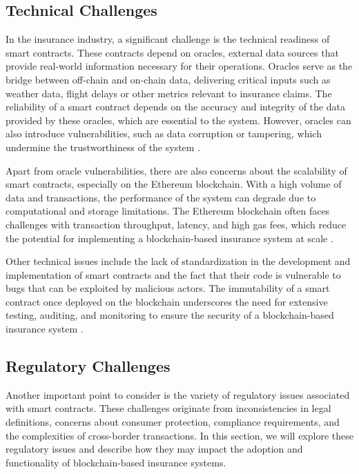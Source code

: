 \subsection{Technical Challenges}
In the insurance industry, a significant challenge is the technical readiness of smart contracts. These contracts depend on oracles, external data sources that provide real-world information necessary for their operations. Oracles serve as the bridge between off-chain and on-chain data, delivering critical inputs such as weather data, flight delays or other metrics relevant to insurance claims. The reliability of a smart contract depends on the accuracy and integrity of the data provided by these oracles, which are essential to the system. However, oracles can also introduce vulnerabilities, such as data corruption or tampering, which undermine the trustworthiness of the system \autocites{Sheldon2020Auditing}{Al-Breiki2020Trustworthy}.

Apart from oracle vulnerabilities, there are also concerns about the scalability of smart contracts, especially on the Ethereum blockchain. With a high volume of data and transactions, the performance of the system can degrade due to computational and storage limitations. The Ethereum blockchain often faces challenges with transaction throughput, latency, and high gas fees, which reduce the potential for implementing a blockchain-based insurance system at scale \autocites{Khan2021Systematic}{Chauhan2018Blockchain}.

Other technical issues include the lack of standardization in the development and implementation of smart contracts and the fact that their code is vulnerable to bugs that can be exploited by malicious actors. The immutability of a smart contract once deployed on the blockchain underscores the need for extensive testing, auditing, and monitoring to ensure the security of a blockchain-based insurance system \autocite{Chen2019Defining}.

\subsection{Regulatory Challenges}
Another important point to consider is the variety of regulatory issues associated with smart contracts. These challenges originate from inconsistencies in legal definitions, concerns about consumer protection, compliance requirements, and the complexities of cross-border transactions. In this section, we will explore these regulatory issues and describe how they may impact the adoption and functionality of blockchain-based insurance systems.

